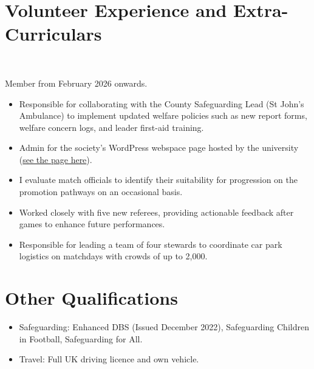 \section*{Volunteer Experience and Extra-Curriculars}

\\\begin{small}Member from February 2026 onwards.\end{small}
\begin{itemize}
    \item Responsible for collaborating with the County Safeguarding Lead (St John's Ambulance) to implement updated welfare policies such as new report forms, welfare concern logs, and leader first-aid training.
    \item Admin for the society's WordPress webspace page hosted by the university (\href{https://speleologicalassociation.webspace.durham.ac.uk/}{see the page here}).
\end{itemize}

\begin{itemize}
    \item I evaluate match officials to identify their suitability for progression on the promotion pathways on an occasional basis.
    \item Worked closely with five new referees, providing actionable feedback after games to enhance future performances.
\end{itemize}

\begin{itemize}
    \item Responsible for leading a team of four stewards to coordinate car park logistics on matchdays with crowds of up to 2,000.
\end{itemize}

\section*{Other Qualifications}

\begin{itemize}
    \item Safeguarding: Enhanced DBS (Issued December 2022), Safeguarding Children in Football, Safeguarding for All.
    \item Travel: Full UK driving licence and own vehicle.
\end{itemize}
